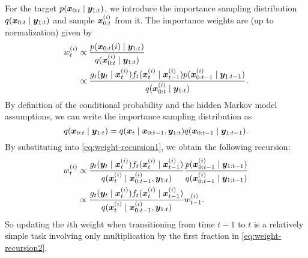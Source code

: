 For the target $p(\bm{x}_{0:t} \mid \bm{y}_{1:t})$, we introduce the importance sampling distribution $q(\bm{x}_{0:t} \mid \bm{y}_{1:t})$ and sample $\bm{x}_{0:t}^{(i)}$ from it. The importance weights are (up to normalization) given by
\begin{equation} \label{eq:weight-recursion1}
\begin{split}
w_t^{(i)} & \propto \frac{p(\bm{x}_{0:t}{(i)} \mid \bm{y}_{1:t})}{q(\bm{x}_{0:t}^{(i)} \mid \bm{y}_{1:t})} \\
& \propto \frac{g_t(\bm{y}_t \mid \bm{x}_t^{(i)}) f_t(\bm{x}_t^{(i)} \mid \bm{x}_{t-1}^{(i)}) p(\bm{x}_{0:t-1}^{(i)} \mid \bm{y}_{1:t-1})}{q(\bm{x}_{0:t}^{(i)} \mid \bm{y}_{1:t})}.
\end{split}
\end{equation}
By definition of the conditional probability and the hidden Markov model assumptions, we can write the importance sampling distribution as
\begin{equation*}
q(\bm{x}_{0:t} \mid \bm{y}_{1:t}) = q(\bm{x}_t \mid \bm{x}_{0:t-1}, \bm{y}_{1:t}) q(\bm{x}_{0:t-1} \mid \bm{y}_{1:t-1}).
\end{equation*}
By substituting into \eqref{eq:weight-recursion1}, we obtain the following recursion:
\begin{equation} \label{eq:weight-recursion2}
\begin{split}
w_t^{(i)} & \propto \frac{g_t(\bm{y}_t \mid \bm{x}_t^{(i)}) f_t(\bm{x}_t^{(i)} \mid \bm{x}_{t-1}^{(i)})}{q(\bm{x}_t^{(i)} \mid \bm{x}_{0:t-1}^{(i)}, \bm{y}_{1:t})} \frac{p(\bm{x}_{0:t-1}^{(i)} \mid \bm{y}_{1:t-1})}{q(\bm{x}_{0:t-1}^{(i)} \mid \bm{y}_{1:t-1})} \\
& \propto \frac{g_t(\bm{y}_t \mid \bm{x}_t^{(i)}) f_t(\bm{x}_t^{(i)} \mid \bm{x}_{t-1}^{(i)})}{q(\bm{x}_t^{(i)} \mid \bm{x}_{0:t-1}^{(i)}, \bm{y}_{1:t})} w_{t-1}^{(i)}.
\end{split}
\end{equation}
So updating the $i$th weight when transitioning from time $t-1$ to $t$ is a relatively simple task involving only multiplication by the first fraction in \eqref{eq:weight-recursion2}.

